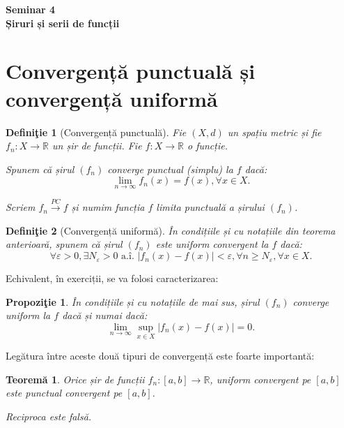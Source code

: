 \documentclass[11pt,a4paper]{article}
\newcommand\xrar{\xrightarrow}
\newcommand\ai{\text{ a.\^{i}. }}
\newcommand\RR{\mathbb{R}}
\theoremstyle{dotless}
\newtheorem{theorem}{Teorem\u{a}}[section]
\newtheorem{proposition}{Propozi\c{t}ie}[section]
\theoremstyle{dotlessdr}
\newtheorem{definition}{Defini\c{t}ie}[section]
\begin{document}
\begin{center}
  {\large\textbf{Seminar 4 \\ Șiruri și serii de funcții}}
\end{center}

\vspace{1cm}

\section{Convergență punctuală și convergență uniformă}
\label{sec:pc-uc}

\begin{definition}[Convergență punctuală]\label{def:pc}
  Fie $(X, d)$ un spațiu metric și fie $f_n : X \to \RR$ un șir de funcții.
  Fie $f : X \to \RR$ o funcție.

  Spunem că șirul $(f_n)$ \emph{converge punctual (simplu)} la $f$ dacă:
  \[
    \lim_{n \to \infty} f_n(x) = f(x), \forall x \in X.
  \]

  Scriem $f_n \xrar{PC} f$ și numim funcția $f$ \emph{limita punctuală} a șirului $(f_n)$.
\end{definition}

\begin{definition}[Convergență uniformă]\label{def:uc}
  În condițiile și cu notațiile din teorema anterioară, spunem că șirul $(f_n)$ este
  \emph{uniform convergent} la $f$ dacă:
  \[
    \forall \varepsilon > 0, \exists N_\varepsilon > 0 \ai |f_n(x) - f(x)| < \varepsilon, %
    \forall n \geq N_\varepsilon, \forall x \in X.
  \]
\end{definition}

Echivalent, în exerciții, se va folosi caracterizarea:

\begin{proposition}\label{pr:uc}
  În condițiile și cu notațiile de mai sus, șirul $(f_n)$ converge uniform la $f$
  dacă și numai dacă:
  \[
    \lim_{n \to \infty} \sup_{x \in X} |f_n(x) - f(x)| = 0.
  \]
\end{proposition}

Legătura între aceste două tipuri de convergență este foarte importantă:

\begin{theorem}\label{thm:pc-uc}
  Orice șir de funcții $f_n : [a, b] \to \RR$, uniform convergent pe $[a, b]$
  este punctual convergent pe $[a, b]$.

  Reciproca este falsă.
\end{theorem}
\end{document}
